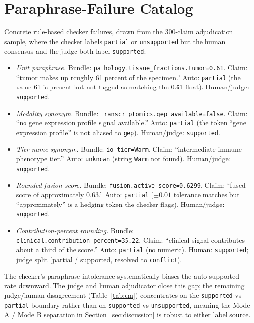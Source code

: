 \documentclass{article}
\theoremstyle{plain}
\begin{document}
\section{Paraphrase-Failure Catalog}
\label{app:paraphrases}

Concrete rule-based checker failures, drawn from the 300-claim adjudication sample, where the checker labels \texttt{partial} or \texttt{unsupported} but the human consensus and the judge both label \texttt{supported}:

\begin{itemize}
\item \emph{Unit paraphrase.} Bundle: \texttt{pathology.tissue\_fractions.tumor=0.61}. Claim: ``tumor makes up roughly 61 percent of the specimen.'' Auto: \texttt{partial} (the value 61 is present but not tagged as matching the 0.61 float). Human/judge: \texttt{supported}.
\item \emph{Modality synonym.} Bundle: \texttt{transcriptomics.gep\_available=false}. Claim: ``no gene expression profile signal available.'' Auto: \texttt{partial} (the token ``gene expression profile'' is not aliased to \texttt{gep}). Human/judge: \texttt{supported}.
\item \emph{Tier-name synonym.} Bundle: \texttt{io\_tier=Warm}. Claim: ``intermediate immune-phenotype tier.'' Auto: \texttt{unknown} (string \texttt{Warm} not found). Human/judge: \texttt{supported}.
\item \emph{Rounded fusion score.} Bundle: \texttt{fusion.active\_score=0.6299}. Claim: ``fused score of approximately 0.63.'' Auto: \texttt{partial} ($\pm 0.01$ tolerance matches but ``approximately'' is a hedging token the checker flags). Human/judge: \texttt{supported}.
\item \emph{Contribution-percent rounding.} Bundle: \texttt{clinical.contribution\_percent=35.22}. Claim: ``clinical signal contributes about a third of the score.'' Auto: \texttt{partial} (no numeric). Human: \texttt{supported}; judge split (partial / supported, resolved to \texttt{conflict}).
\end{itemize}

The checker's paraphrase-intolerance systematically biases the auto-supported rate downward. The judge and human adjudicator close this gap; the remaining judge/human disagreement (Table~\ref{tab:cm}) concentrates on the \texttt{supported} vs \texttt{partial} boundary rather than on \texttt{supported} vs \texttt{unsupported}, meaning the Mode A / Mode B separation in Section~\ref{sec:discussion} is robust to either label source.
\end{document}
